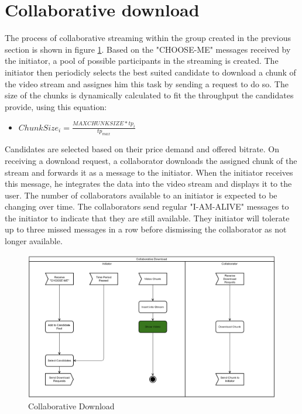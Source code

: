 \section{Collaborative download}
The process of collaborative streaming within the group created in the previous section is shown in figure \ref{grpfrm2}.
Based on the "CHOOSE-ME" messages received by the initiator, a pool of possible participants in the streaming is created. The initiator then periodicly selects the best suited candidate to download a chunk of the video stream and assignes him this task by sending a request to do so. The size of the chunks is dynamically calculated to fit the throughput the candidates provide, using this equation:  \begin{itemize}
\item $Chunk Size_{i}=\frac{MAX CHUNK SIZE * tp_{i}}{tp_{max}}$
\end{itemize}
Candidates are selected based on their price demand and offered bitrate. On receiving a download request, a collaborator downloads the assigned chunk of the stream and forwards it as a message to the initiator. When the initiator receives this message, he integrates the data into the video stream and displays it to the user.
The number of collaborators available to an initiator is expected to be changing over time. The collaborators send regular "I-AM-ALIVE" messages to the initiator to indicate that they are still available. They initiator will tolerate up to three missed messages in a row before dismissing the collaborator as not longer available.


\begin{figure}[hbtp]
\centering
\includegraphics[scale=.6]{figures/Workflow_2.png}
\caption{Collaborative Download}
\label{grpfrm2}
\end{figure}


